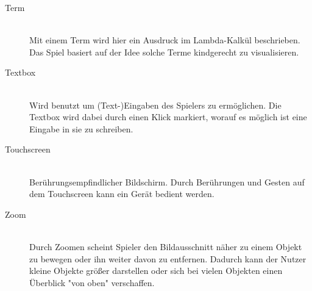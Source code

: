 \begin{description}
	\item[Term] \hfill \\
	Mit einem Term wird hier ein Ausdruck im Lambda-Kalkül beschrieben. Das Spiel basiert auf der Idee solche Terme kindgerecht 
	zu visualisieren.
	
	\item[Textbox] \hfill \\
	Wird benutzt um (Text-)Eingaben des Spielers zu ermöglichen. Die Textbox wird dabei durch einen Klick markiert,
	worauf es möglich ist eine Eingabe in sie zu schreiben.
	
	\item[Touchscreen] \hfill \\
	Berührungsempfindlicher Bildschirm. Durch Berührungen und Gesten auf dem Touchscreen kann ein Gerät bedient werden.
	
	\item[Zoom] \hfill \\
	Durch Zoomen scheint Spieler den Bildausschnitt näher zu einem Objekt zu bewegen oder ihn weiter davon zu entfernen.
	Dadurch kann der Nutzer kleine Objekte größer darstellen oder sich bei vielen Objekten einen Überblick "von oben" verschaffen. 
\end{description}
